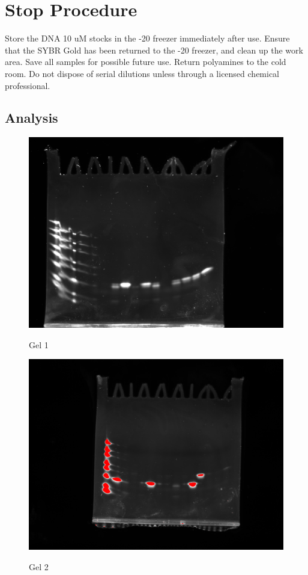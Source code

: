 \documentclass{ssiBio}
\begin{document}
\section{Stop Procedure}
Store the DNA 10 uM stocks in the -20 freezer immediately after use. Ensure that the SYBR Gold has been returned to the -20 freezer, and clean up the work area. Save all samples for possible future use.
Return polyamines to the cold room. Do not dispose of serial dilutions unless through a licensed chemical professional.

\subsection{Analysis}

\begin{figure}[ht]
\centering
\includegraphics[width=6in]{./gel1.png}
\label{}
\caption{Gel 1}
\end{figure}

\begin{figure}[ht]
\centering
\includegraphics[width=6in]{./gel2.png}
\label{}
\caption{Gel 2}
\end{figure}



\end{document}
